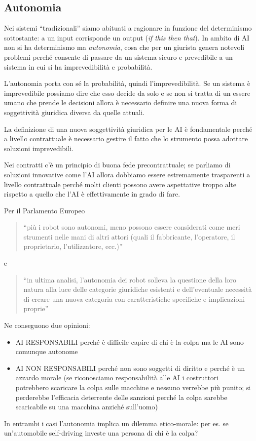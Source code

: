 \subsection{Autonomia}
Nei sistemi ``tradizionali'' siamo abituati a ragionare in funzione del determinismo sottostante: a un input corrisponde un output (\textit{if this then that}). 
In ambito di AI non si ha determinismo ma \textit{autonomia}, cosa che per un giurista genera notevoli problemi perché consente di passare da un sistema sicuro e prevedibile a un sistema in cui si ha imprevedibilità e probabilità. 

L'autonomia porta con sé la probabilità, quindi l'imprevedibilità. Se un sistema è imprevedibile possiamo dire che esso decide da solo e se non si tratta di un essere umano che prende le decisioni allora è necessario definire una nuova forma di soggettività giuridica diversa da quelle attuali. 

La definizione di una nuova soggettività giuridica per le AI è fondamentale perché a livello contrattuale è necessario gestire il fatto che lo strumento possa adottare soluzioni imprevedibili. 

Nei contratti c'è un principio di buona fede precontrattuale; se parliamo di soluzioni innovative come l'AI allora dobbiamo essere estremamente trasparenti a livello contrattuale perché molti clienti possono avere aspettative troppo alte rispetto a quello che l'AI è effettivamente in grado di fare.

Per il Parlamento Europeo
\begin{quote}
    ``più i robot sono autonomi, meno possono essere considerati come meri strumenti nelle mani di altri attori (quali il fabbricante, l'operatore, il proprietario, l'utilizzatore, ecc.)''
\end{quote}
e 
\begin{quote}
    ``in ultima analisi, l'autonomia dei robot solleva la questione della loro natura alla luce delle categorie giuridiche esistenti e dell'eventuale necessità di creare una nuova categoria con caratteristiche specifiche e implicazioni proprie''
\end{quote}
Ne conseguono due opinioni:
\begin{itemize}
    \item AI RESPONSABILI perché è difficile capire di chi è la colpa ma le AI sono comunque autonome
    \item AI NON RESPONSABILI perché non sono soggetti di diritto e perché è un azzardo morale (se riconosciamo responsabilità alle AI i costruttori potrebbero scaricare la colpa sulle macchine e nessuno verrebbe più punito; si perderebbe l'efficacia deterrente delle sanzioni perché la colpa sarebbe scaricabile su una macchina anziché sull'uomo)
\end{itemize}
In entrambi i casi l'autonomia implica un dilemma etico-morale: per es. se un'automobile self-driving investe una persona di chi è la colpa?

